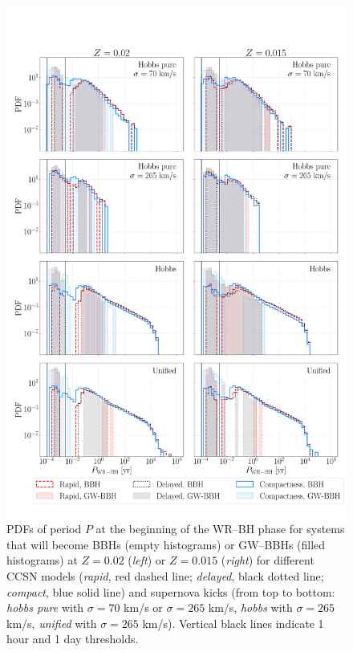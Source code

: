 \documentclass[a4paper,titlepage]{book}     	%
\begin{document}
\begin{appendices}
\begin{figure}
	\centering
	\includegraphics[width=\textwidth]{./images/WRBH-P.pdf}	
	\caption{PDFs of period $P$ at the beginning of the WR--BH phase for systems that will become BBHs (empty histograms) or GW--BBHs (filled histograms) at $Z=0.02$ (\emph{left}) or $Z=0.015$ (\emph{right}) for different CCSN models (\emph{rapid}, red dashed line; \emph{delayed}, black dotted line; \emph{compact}, blue solid line) and supernova kicks (from top to bottom: \emph{hobbs pure} with $\sigma = 70$ km/s or $\sigma = 265$ km/s, \emph{hobbs} with $\sigma = 265$ km/s, \emph{unified} with $\sigma = 265$ km/s). Vertical black lines indicate 1 hour and 1 day thresholds.}\label{fig:resultsWRBH-P}
\end{figure}










\end{appendices}
\end{document}
